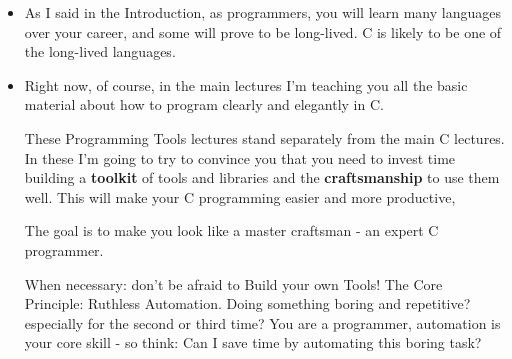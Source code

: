 \documentclass[handout]{beamer}
\begin{document}
\begin{frame}
\large
      \begin{itemize}
      \item
      As I said in the Introduction, as programmers, you will learn
      \alert{many languages} over your career, and some will prove to
      be long-lived.  C is likely to be one of the long-lived languages.

      \item
      Right now, of course, in the main lectures I'm teaching you all the
      basic material about how to program clearly and elegantly in C.
      \pause

      \pitem
      These Programming Tools lectures stand separately from the main
      C lectures. In these I'm going to try to convince you that you need
      to invest time building a {\bf toolkit} of tools and libraries and the
      {\bf craftsmanship} to use them well.
      This will make your C programming easier and more productive,

    \pitem
      The goal is to make you look like a \alert{master craftsman} - an expert C programmer.

    \pitem
      When necessary: don't be afraid to \alert{Build your own Tools!}
    \pitem
      The Core Principle: \alert{Ruthless Automation}.
    \pitem
      Doing something boring and repetitive?
    \pause
      especially for the second or third time?
    \pitem
      You are a \alert{programmer}, automation is your core skill -
      so think:
      \alert{Can I save time by automating this boring task?}
    \end{itemize}
\end{frame}
\end{document}
